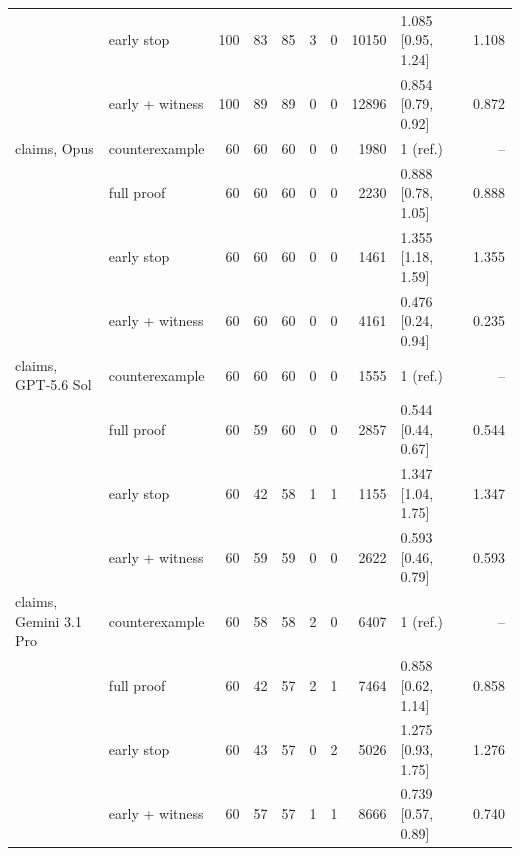 \begin{table}[!htbp]
\begin{tabular}{llrrrrrrlr}
 & early stop & 100 & 83 & 85 & 3 & 0 & 10150 & 1.085 [0.95, 1.24] & 1.108 \\
 & early + witness & 100 & 89 & 89 & 0 & 0 & 12896 & 0.854 [0.79, 0.92] & 0.872 \\
\midrule
claims, Opus & counterexample & 60 & 60 & 60 & 0 & 0 & 1980 & 1 (ref.) & -- \\
 & full proof & 60 & 60 & 60 & 0 & 0 & 2230 & 0.888 [0.78, 1.05] & 0.888 \\
 & early stop & 60 & 60 & 60 & 0 & 0 & 1461 & 1.355 [1.18, 1.59] & 1.355 \\
 & early + witness & 60 & 60 & 60 & 0 & 0 & 4161 & 0.476 [0.24, 0.94] & 0.235 \\
\midrule
claims, GPT-5.6 Sol & counterexample & 60 & 60 & 60 & 0 & 0 & 1555 & 1 (ref.) & -- \\
 & full proof & 60 & 59 & 60 & 0 & 0 & 2857 & 0.544 [0.44, 0.67] & 0.544 \\
 & early stop & 60 & 42 & 58 & 1 & 1 & 1155 & 1.347 [1.04, 1.75] & 1.347 \\
 & early + witness & 60 & 59 & 59 & 0 & 0 & 2622 & 0.593 [0.46, 0.79] & 0.593 \\
\midrule
claims, Gemini 3.1 Pro & counterexample & 60 & 58 & 58 & 2 & 0 & 6407 & 1 (ref.) & -- \\
 & full proof & 60 & 42 & 57 & 2 & 1 & 7464 & 0.858 [0.62, 1.14] & 0.858 \\
 & early stop & 60 & 43 & 57 & 0 & 2 & 5026 & 1.275 [0.93, 1.75] & 1.276 \\
 & early + witness & 60 & 57 & 57 & 1 & 1 & 8666 & 0.739 [0.57, 0.89] & 0.740 \\
\bottomrule
\end{tabular}
\end{table}
